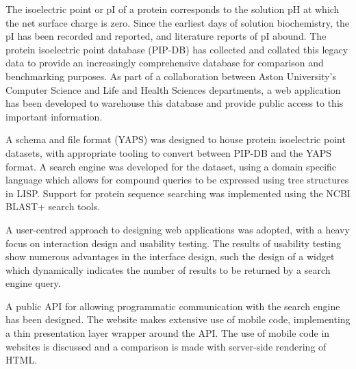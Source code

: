 \thispagestyle{plain}


\begin{center}
  \Large
  \textbf{\@title}

  \vspace{0.4cm}
  \large
  \subtitle{}

  \vspace{0.4cm}
  \@author
\end{center}



The isoelectric point or pI of a protein corresponds to the solution
pH at which the net surface charge is zero. Since the earliest days of
solution biochemistry, the pI has been recorded and
reported, and literature reports of pI abound. The protein isoelectric
point database (PIP-DB) has collected and collated this legacy data to
provide an increasingly comprehensive database for comparison and
benchmarking purposes. As part of a collaboration between Aston
University's Computer Science and Life and Health Sciences
departments, a web application has been developed to warehouse this
database and provide public access to this important information.

A schema and file format (YAPS) was designed to house protein
isoelectric point datasets, with appropriate tooling to convert
between PIP-DB and the YAPS format. A search engine was developed for
the dataset, using a domain specific language which allows for
compound queries to be expressed using tree structures in
LISP. Support for protein sequence searching was implemented using the
NCBI BLAST+ search tools.

A user-centred approach to designing web applications was adopted,
with a heavy focus on interaction design and usability testing. The
results of usability testing show numerous advantages in the interface
design, such the design of a widget which dynamically indicates the
number of results to be returned by a search engine query.

A public API for allowing programmatic communication with the search
engine has been designed. The website makes extensive use of mobile
code, implementing a thin presentation layer wrapper around the
API. The use of mobile code in websites is discussed and a comparison
is made with server-side rendering of HTML.

